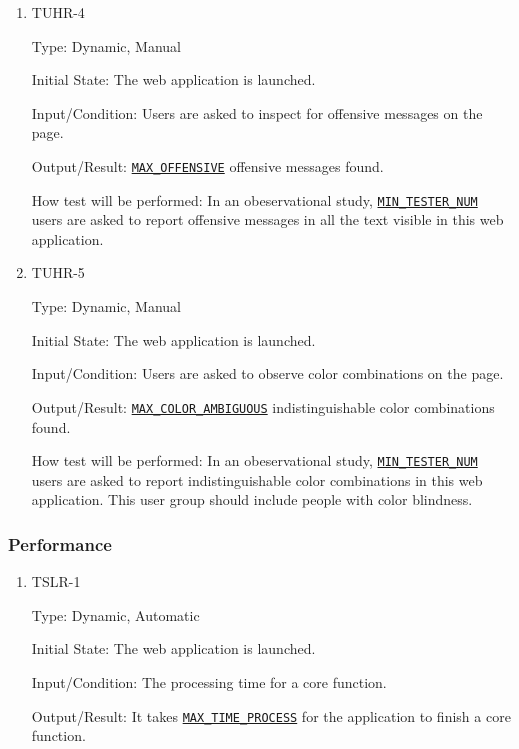 \documentclass[12pt, titlepage]{article}
\begin{document}
\begin{enumerate}
\begin{enumerate}
\item{TUHR-4\\}\label{TUHR-4}

Type: Dynamic, Manual
					
Initial State: The web application is launched.
					
Input/Condition: Users are asked to inspect for offensive messages on the page.
					
Output/Result: \hyperref[MAX_OFFENSIVE]{\texttt{MAX\_OFFENSIVE}} offensive messages found.
					
How test will be performed: In an obeservational study, \hyperref[MIN_TESTER_NUM]{\texttt{MIN\_TESTER\_NUM}} users are asked to report offensive messages in all the text visible in this web application.

\item{TUHR-5\\}\label{TUHR-5}

Type: Dynamic, Manual
					
Initial State: The web application is launched.
					
Input/Condition: Users are asked to observe color combinations on the page.
					
Output/Result: \hyperref[MAX_COLOR_AMBIGUOUS]{\texttt{MAX\_COLOR\_AMBIGUOUS}} indistinguishable color combinations found.
					
How test will be performed: In an obeservational study, \hyperref[MIN_TESTER_NUM]{\texttt{MIN\_TESTER\_NUM}} users are asked to report indistinguishable color combinations in this web application. This user group should include people with color blindness.


\end{enumerate}

\subsubsection{Performance}

\begin{enumerate}
\item{TSLR-1\\}\label{TSLR-1}

Type: Dynamic, Automatic
					
Initial State: The web application is launched.
					
Input/Condition: The processing time for a core function.
					
Output/Result: It takes \hyperref[MAX_TIME_PROCESS]{\texttt{MAX\_TIME\_PROCESS}} for the application to finish a core function.
					

\end{enumerate}
\end{enumerate}
\end{document}
